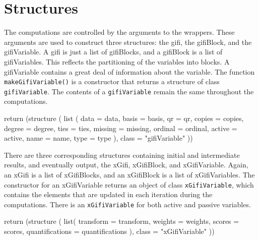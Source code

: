 \documentclass[
  12pt,
  letterpaper,
  DIV=11,
  numbers=noendperiod]{scrreprt}
\newenvironment{Shaded}{\begin{snugshade}}{\end{snugshade}}
\newcommand{\AttributeTok}[1]{\textcolor[rgb]{0.40,0.45,0.13}{#1}}
\newcommand{\FunctionTok}[1]{\textcolor[rgb]{0.28,0.35,0.67}{#1}}
\newcommand{\NormalTok}[1]{\textcolor[rgb]{0.00,0.23,0.31}{#1}}
\newcommand{\StringTok}[1]{\textcolor[rgb]{0.13,0.47,0.30}{#1}}
\begin{document}
\section{Structures}\label{structures}

The computations are controlled by the arguments to the wrappers. These
arguments are used to construct three structures: the gifi, the
gifiBlock, and the gifiVariable. A gifi is just a list of gifiBlocks,
and a gifiBlock is a list of gifiVariables. This reflects the
partitioning of the variables into blocks. A gifiVariable contains a
great deal of information about the variable. The function
\texttt{makeGifiVariable()} is a constructor that returns a structure of
class \texttt{gifiVariable}. The contents of a \texttt{gifiVariable}
remain the same throughout the computations.

\begin{Shaded}
\begin{Highlighting}[]
    \FunctionTok{return}\NormalTok{ (}\FunctionTok{structure}\NormalTok{ (}
      \FunctionTok{list}\NormalTok{ (}
        \AttributeTok{data =}\NormalTok{ data,}
        \AttributeTok{basis =}\NormalTok{ basis,}
        \AttributeTok{qr =}\NormalTok{ qr,}
        \AttributeTok{copies =}\NormalTok{ copies,}
        \AttributeTok{degree =}\NormalTok{ degree,}
        \AttributeTok{ties =}\NormalTok{ ties,}
        \AttributeTok{missing =}\NormalTok{ missing,}
        \AttributeTok{ordinal =}\NormalTok{ ordinal,}
        \AttributeTok{active =}\NormalTok{ active,}
        \AttributeTok{name =}\NormalTok{ name,}
        \AttributeTok{type =}\NormalTok{ type}
\NormalTok{      ),}
      \AttributeTok{class =} \StringTok{"gifiVariable"}
\NormalTok{    ))}
\end{Highlighting}
\end{Shaded}

There are three corresponding structures containing initial and
intermediate results, and eventually output, the xGifi, xGifiBlock, and
xGifiVariable. Again, an xGifi is a list of xGifiBlocks, and an
xGifiBlock is a list of xGifiVariables. The constructor for an
xGifiVariable returns an object of class \texttt{xGifiVariable}, which
contains the elements that are updated in each iteration during the
computations. There is an \texttt{xGifiVariable} for both active and
passive variables.

\begin{Shaded}
\begin{Highlighting}[]
 \FunctionTok{return}\NormalTok{ (}\FunctionTok{structure}\NormalTok{ (}
    \FunctionTok{list}\NormalTok{(}
      \AttributeTok{transform =}\NormalTok{ transform,}
      \AttributeTok{weights =}\NormalTok{ weights,}
      \AttributeTok{scores =}\NormalTok{ scores,}
      \AttributeTok{quantifications =}\NormalTok{ quantifications}
\NormalTok{    ),}
    \AttributeTok{class =} \StringTok{"xGifiVariable"}
\NormalTok{  ))}
\end{Highlighting}
\end{Shaded}
\end{document}

